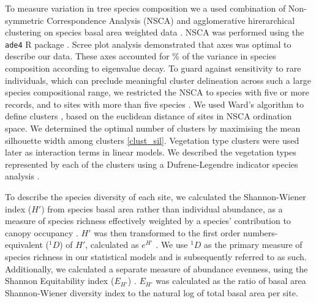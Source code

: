 \documentclass[11pt,a4paper]{article}
\begin{document}
To measure variation in tree species composition we a used combination of Non-symmetric Correspondence Analysis (NSCA) and agglomerative hirerarchical clustering on species basal area weighted data \citep{Kreft2010, Fayolle2014}. NSCA was performed using the \texttt{ade4} R package \citep{ade4}. Scree plot analysis demonstrated that \nscaAxes{} axes was optimal to describe our data. These axes accounted for \nscaInertia{}\% of the variance in species composition according to eigenvalue decay. To guard against sensitivity to rare individuals, which can preclude meaningful cluster delineation across such a large species compositional range, we restricted the NSCA to species with five or more records, and to sites with more than five species \citep{}. We used Ward's algorithm to define clusters \citep{Murtagh2014}, based on the euclidean distance of sites in NSCA ordination space. We determined the optimal number of clusters by maximising the mean silhouette width among clusters \citep{Rousseeuw1987} \autoref{clust_sil}. Vegetation type clusters were used later as interaction terms in linear models. We described the vegetation types represented by each of the clusters using a Dufrene-Legendre indicator species analysis \citep{Dufrene1997}.

To describe the species diversity of each site, we calculated the Shannon-Wiener index ($H'$) from species basal area rather than individual abundance, as a measure of species richness effectively weighted by a species' contribution to canopy occupancy \citep{}. $H'$ was then transformed to the first order numbers-equivalent ($^1\!D$) of $H'$, calculated as $e^{H'}$ \citep{}. We use $^1\!D$ as the primary measure of species richness in our statistical models and is subsequently referred to as such. Additionally, we calculated a separate measure of abundance evenness, using the Shannon Equitability index ($E_{H'}$) \citep{Smith1996}. $E_{H'}$ was calculated as the ratio of basal area Shannon-Wiener diversity index to the natural log of total basal area per site.
\end{document}
